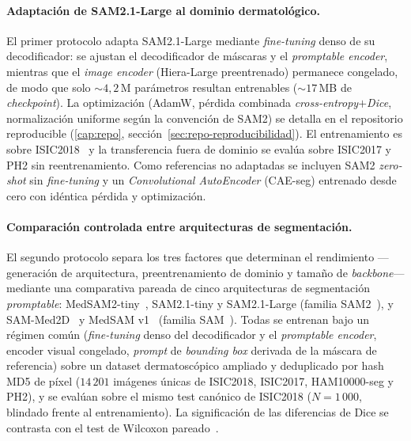 \paragraph{Adaptación de SAM2.1-Large al dominio dermatológico.}
El primer protocolo adapta SAM2.1-Large mediante \emph{fine-tuning}
denso de su decodificador: se ajustan el decodificador de máscaras y
el \emph{promptable encoder}, mientras que el \emph{image encoder}
(Hiera-Large preentrenado) permanece congelado, de modo que solo
$\sim 4{,}2$\,M parámetros resultan entrenables ($\sim 17$\,MB de
\emph{checkpoint}). La optimización (AdamW, pérdida combinada
\emph{cross-entropy}$+$\emph{Dice}, normalización uniforme según la
convención de SAM2) se detalla en el repositorio reproducible
(\ref{cap:repo}, sección~\ref{sec:repo-reproducibilidad}). El
entrenamiento es sobre ISIC2018~\cite{isic2018} y la transferencia
fuera de dominio se evalúa sobre ISIC2017 y PH2 sin reentrenamiento.
Como referencias no adaptadas se incluyen SAM2 \emph{zero-shot} sin
\emph{fine-tuning} y un \emph{Convolutional AutoEncoder} (CAE-seg)
entrenado desde cero con idéntica pérdida y optimización.

\paragraph{Comparación controlada entre arquitecturas de
segmentación.}
El segundo protocolo separa los tres factores que determinan el
rendimiento ---generación de arquitectura, preentrenamiento de
dominio y tamaño de \emph{backbone}--- mediante una comparativa
pareada de cinco arquitecturas de segmentación \emph{promptable}:
MedSAM2-tiny~\cite{medsam2}, SAM2.1-tiny y SAM2.1-Large (familia
SAM2~\cite{sam2}), y SAM-Med2D~\cite{sammed2d} y MedSAM
v1~\cite{medsam} (familia SAM~\cite{sam2023}). Todas se entrenan
bajo un régimen común (\emph{fine-tuning} denso del decodificador y
el \emph{promptable encoder}, encoder visual congelado, \emph{prompt}
de \emph{bounding box} derivada de la máscara de referencia) sobre un
dataset dermatoscópico ampliado y deduplicado por hash MD5 de píxel
($14\,201$ imágenes únicas de ISIC2018, ISIC2017, HAM10000-seg y
PH2), y se evalúan sobre el mismo test canónico de ISIC2018
($N = 1\,000$, blindado frente al entrenamiento). La significación
de las diferencias de Dice se contrasta con el test de Wilcoxon
pareado~\cite{wilcoxon1945}.


